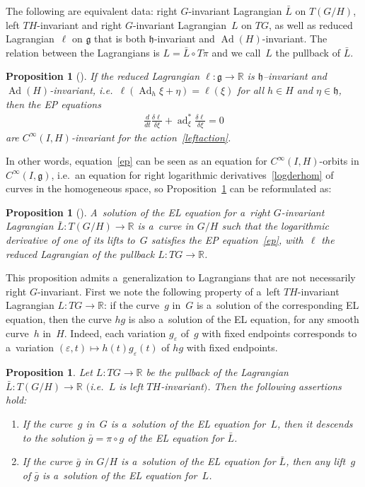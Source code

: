 \documentclass[pdftex]{sigma}
\numberwithin{equation}{section}
\newtheorem{Proposition}[Theorem]{Proposition}
{ \theoremstyle{definition}
\newtheorem{Example}[Theorem]{Example}
\newtheorem{Remark}[Theorem]{Remark} }
\begin{document}
The following are equivalent data: right $G$-invariant Lagrangian $\bar L$ on $T(G/H)$, left $TH$-invariant and
right $G$-invariant Lagrangian~$L$ on $TG$, as well as reduced Lagrangian~$\ell$ on $\mathfrak g$ that is both
$\mathfrak h$-invariant and $\operatorname{Ad}(H)$-invariant.
The relation between the Lagrangians is $L=\bar L\circ T\pi$ and we call~$L$ the pullback of $\bar L$.

\begin{Proposition}[\cite{TV}]
\label{elhomo}
If the reduced Lagrangian $\ell:\mathfrak g\to\mathbb R$ is $\mathfrak h$--invariant and
$\operatorname{Ad}(H)$-invariant, i.e.\ $\ell(\operatorname{Ad}_h\xi+\eta)=\ell(\xi)$ for all $h\in H$ and
$\eta\in\mathfrak h$, then the EP equations
\begin{gather}
\label{ep}
\frac{d}{dt}\frac{\delta\ell}{\delta \xi}+\operatorname{ad}^*_\xi\frac{\delta\ell}{\delta\xi}=0
\end{gather}
are $C^{\infty}(I,H)$-invariant for the action~\eqref{leftaction}.
\end{Proposition}

In other words, equation~\eqref{ep} can be seen as an equation for $C^{\infty}(I,H)$-orbits in $C^{\infty}(I,\mathfrak g)$,
i.e.\ an equation for right logarithmic derivatives~\eqref{logderhom} of curves in the homogeneous space, so
Proposition~\ref{elhomo} can be reformulated as:

\begin{Proposition}[\cite{TV}]
A~solution of the EL equation for a~right $G$-invariant Lagrangian $\bar L:T(G/H)\to\mathbb R$ is a~curve in
$G/H$ such that the logarithmic derivative of one of its lifts to~$G$ satisfies the EP equation~\eqref{ep}, with~$\ell$
the reduced Lagrangian of the pullback $L:TG\to\mathbb R$.
\end{Proposition}

This proposition admits a~generalization to Lagrangians that are not necessarily right $G$-invariant.
First we note the following property of a~left $TH$-invariant Lagrangian $L:TG\to\mathbb R$: if the curve~$g$ in~$G$ is
a~solution of the corresponding EL equation, then the curve $hg$ is also a~solution of the EL equation, for any smooth
curve~$h$ in~$H$.
Indeed, each variation $g_\varepsilon$ of~$g$ with f\/ixed endpoints corresponds to a~variation $(\varepsilon,t)\mapsto
h(t)g_\varepsilon(t)$ of $hg$ with f\/ixed endpoints.

\begin{Proposition}
Let $L:TG\to\mathbb R$ be the pullback of the Lagrangian $\bar L:T(G/H)\to\mathbb R$ $($i.e.~$L$ is left $TH$-invariant$)$.
Then the following assertions hold:
\begin{enumerate}\itemsep=0pt
\item[$(i)$] If the curve~$g$ in~$G$ is a~solution of the EL equation for~$L$, then it descends to the solution $\bar g=\pi\circ
g$ of the EL equation for $\bar L$.
\item[$(ii)$] If the curve $\bar g$ in $G/H$ is a~solution of the EL equation for $\bar L$, then any lift~$g$ of $\bar g$ is
a~solution of the EL equation for~$L$.
\end{enumerate}
\end{Proposition}
\end{document}
